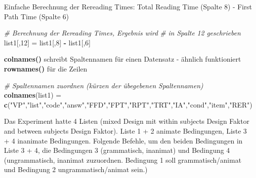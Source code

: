 \documentclass[]{book}
\newenvironment{Shaded}{\begin{snugshade}}{\end{snugshade}}
\newcommand{\KeywordTok}[1]{\textcolor[rgb]{0.13,0.29,0.53}{\textbf{#1}}}
\newcommand{\DecValTok}[1]{\textcolor[rgb]{0.00,0.00,0.81}{#1}}
\newcommand{\StringTok}[1]{\textcolor[rgb]{0.31,0.60,0.02}{#1}}
\newcommand{\CommentTok}[1]{\textcolor[rgb]{0.56,0.35,0.01}{\textit{#1}}}
\newcommand{\OperatorTok}[1]{\textcolor[rgb]{0.81,0.36,0.00}{\textbf{#1}}}
\newcommand{\NormalTok}[1]{#1}
\begin{document}
Einfache Berechnung der Rereading Times: Total Reading Time (Spalte 8) -
First Path Time (Spalte 6)

\begin{Shaded}
\begin{Highlighting}[]
\CommentTok{# Berechnung der Rereading Times, Ergebnis wird }
\CommentTok{# in Spalte 12 geschrieben}
\NormalTok{list1[,}\DecValTok{12}\NormalTok{] =}\StringTok{ }\NormalTok{list1[,}\DecValTok{8}\NormalTok{] }\OperatorTok{-}\StringTok{ }\NormalTok{list1[,}\DecValTok{6}\NormalTok{]}
\end{Highlighting}
\end{Shaded}

\textbf{colnames()} schreibt Spaltennamen für einen Datensatz - ähnlich
funktioniert \textbf{rownames()} für die Zeilen

\begin{Shaded}
\begin{Highlighting}[]
\CommentTok{# Spaltennamen zuordnen (kürzen der übegebenen Spaltennamen)}
\KeywordTok{colnames}\NormalTok{(list1) =}\StringTok{ }\KeywordTok{c}\NormalTok{(}\StringTok{"VP"}\NormalTok{,}\StringTok{"list"}\NormalTok{,}\StringTok{"code"}\NormalTok{,}\StringTok{"answ"}\NormalTok{,}\StringTok{"FFD"}\NormalTok{,}\StringTok{"FPT"}\NormalTok{,}\StringTok{"RPT"}\NormalTok{,}\StringTok{"TRT"}\NormalTok{,}\StringTok{"IA"}\NormalTok{,}\StringTok{"cond"}\NormalTok{,}\StringTok{"item"}\NormalTok{,}\StringTok{"RER"}\NormalTok{)}
\end{Highlighting}
\end{Shaded}

Das Experiment hatte 4 Listen (mixed Design mit within subjects Design
Faktor and between subjects Design Faktor). Liste 1 + 2 animate
Bedingungen, Liste 3 + 4 inanimate Bedingungen. Folgende Befehle, um den
beiden Bedingungen in Liste 3 + 4, die Bedingungen 3 (grammatisch,
inanimat) und Bedingung 4 (ungrammatisch, inanimat zuzuordnen. Bedingung
1 soll grammatisch/animat und Bedingung 2 ungrammatisch/animat sein.)

\begin{Shaded}
\end{Shaded}
\end{document}
